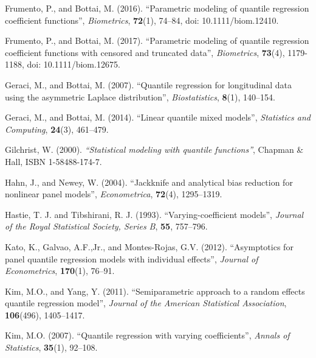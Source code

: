 \documentclass[12pt]{article}
\begin{document}
\begin{thebibliography}{7}
Frumento, P., and Bottai, M. (2016).
\newblock ``Parametric modeling of quantile regression coefficient functions'',
\newblock \textit{Biometrics}, \textbf{72}(1), 74--84, doi: 10.1111/biom.12410. 


Frumento, P., and Bottai, M. (2017).
\newblock ``Parametric modeling of quantile regression coefficient functions with censored and truncated data'',
\newblock \textit{Biometrics}, \textbf{73}(4), 1179-1188, doi: 10.1111/biom.12675. 

Geraci, M., and Bottai, M. (2007).
\newblock ``Quantile regression for longitudinal data using the asymmetric Laplace distribution'',
\newblock \textit{Biostatistics}, \textbf{8}(1), 140--154.


Geraci, M., and Bottai, M. (2014).
\newblock ``Linear quantile mixed models'',
\newblock \textit{Statistics and Computing}, \textbf{24}(3), 461--479.


Gilchrist, W. (2000).
\newblock \textit{``Statistical modeling with quantile functions''},
\newblock Chapman \& Hall, ISBN 1-58488-174-7.

Hahn, J., and Newey, W. (2004).
\newblock ``Jackknife and analytical bias reduction for nonlinear panel models'',
\newblock \textit{Econometrica}, \textbf{72}(4), 1295--1319. 


Hastie, T. J. and Tibshirani, R. J. (1993).
\newblock ``Varying-coefficient models'',
\newblock \textit{Journal of the Royal Statistical Society, Series B}, \textbf{55}, 757--796. 



Kato, K., Galvao, A.F.,Jr., and Montes-Rojas, G.V. (2012).
\newblock ``Asymptotics for panel quantile regression models with individual effects'',
\newblock \textit{Journal of Econometrics}, \textbf{170}(1), 76--91.

Kim, M.O., and Yang, Y. (2011).
\newblock ``Semiparametric approach to a random effects quantile regression model'',
\newblock \textit{Journal of the American Statistical Association}, \textbf{106}(496), 1405--1417.

Kim, M.O. (2007).
\newblock ``Quantile regression with varying coefficients'',
\newblock \textit{Annals of Statistics}, \textbf{35}(1), 92--108.



\end{thebibliography}
\end{document}
